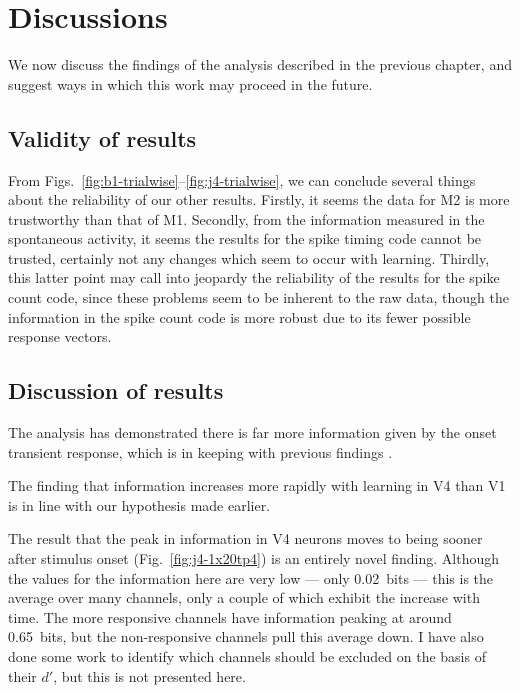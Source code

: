 \section{Discussions}

We now discuss the findings of the analysis described in the previous chapter, and suggest ways in which this work may proceed in the future.

\subsection{Validity of results}

From Figs.~\ref{fig:b1-trialwise}--\ref{fig:j4-trialwise}, we can conclude several things about the reliability of our other results.
Firstly, it seems the data for \ac{M2} is more trustworthy than that of \ac{M1}.
Secondly, from the information measured in the spontaneous activity, it seems the results for the spike timing code cannot be trusted, certainly not any changes which seem to occur with learning.
Thirdly, this latter point may call into jeopardy the reliability of the results for the spike count code, since these problems seem to be inherent to the raw data, though the information in the spike count code is more robust due to its fewer possible response vectors.

\subsection{Discussion of results}

The analysis has demonstrated there is far more information given by the onset transient response, which is in keeping with previous findings \cite{Muller2001}.

The finding that information increases more rapidly with learning in \ac{V4} than \ac{V1} is in line with our hypothesis made earlier.

The result that the peak in information in \ac{V4} neurons moves to being sooner after stimulus onset (Fig.~\ref{fig:j4-1x20tp4}) is an entirely novel finding.
Although the values for the information here are very low --- only \SI{0.02}{bits} --- this is the average over many channels, only a couple of which exhibit the increase with time.
The more responsive channels have information peaking at around \SI{0.65}{bits}, but the non-responsive channels pull this average down.
I have also done some work to identify which channels should be excluded on the basis of their $d'$, but this is not presented here.

